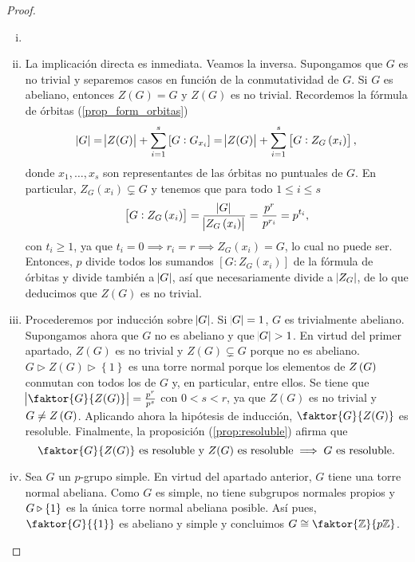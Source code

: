\begin{proof}
    \begin{enumerate}[i)]
        \item[]
        \item La implicación directa es inmediata. Veamos la inversa. Supongamos que $G$ es no trivial y separemos casos en función de la conmutatividad de $G$. Si $G$ es abeliano, entonces $Z(G) = G$ y $Z(G)$ es no trivial.
            Recordemos la fórmula de órbitas (\ref{prop_form_orbitas})
            \[
                \abs{G} =  \abs{Z(G)} + \sum^s_{i=1} \left[ G : G_{x_i} \right] =  \abs{Z(G)} + \sum^s_{i=1} \left[ G : Z_G\left( x_i \right) \right],
            \]
            donde $x_1, \dots, x_s$ son representantes de las órbitas no puntuales de $G$. En
            particular, $Z_G\left( x_i \right) \subsetneq G$ y tenemos que para todo $1\leq i\leq s$
            \[
                \left[ G : Z_G\left( x_i \right) \right] = \frac{\abs{G}}{\abs{Z_G\left( x_i \right)}} =
                \frac{p^r}{p^{r_i}} = p^{t_i},
            \]
            con $t_i \geq 1$, ya que $t_i = 0 \implies r_i = r \implies Z_G\left( x_i \right) = G$, lo cual no
            puede ser. Entonces, $p$ divide todos los sumandos $\left[ G : Z_G\left( x_i \right) \right]$ de la fórmula de órbitas y divide también a $\abs{G}$, así que necesariamente divide a $\abs{Z_G}$, de lo que deducimos que $Z(G)$ es no trivial.
            
        \item Procederemos por inducción sobre $\abs{G}$. Si $\abs{G} = 1$, $G$ es trivialmente abeliano.
            Supongamos ahora que $G$ no es abeliano y que $\abs{G} > 1$. En virtud del primer apartado,
            $Z(G)$ es no trivial y $Z(G) \subsetneq G$ porque no es abeliano.
            $G \triangleright Z(G) \triangleright \left\{ 1 \right\}$ es una torre normal
            porque los elementos de $Z\left( G\right)$ conmutan con todos los de $G$ y, en particular,
            entre ellos. Se tiene que 
            $\abs{\faktor{G}{Z(G)}} = \frac{p^r}{p^{s}}$ con $0 < s < r$, ya que $Z(G)$ es no trivial y
            $G\neq Z\left( G\right)$. Aplicando ahora la hipótesis de inducción, $\faktor{G}{Z(G)}$ es resoluble.
            Finalmente, la proposición (\ref{prop:resoluble}) afirma que             
            \[
                \faktor{G}{Z(G)} \text{ es resoluble y } Z(G) \text{ es resoluble} \implies G
                \text{ es resoluble}.
            \]
        \item Sea $G$ un $p$-grupo simple. En virtud del apartado anterior, $G$ tiene una torre normal abeliana.
            Como $G$ es simple, no tiene subgrupos normales propios y
            $G \triangleright \left\{ 1 \right\}$ es la única torre normal abeliana posible.
            Así pues, $\faktor{G}{\lc 1\rc}$ es abeliano y simple y concluimos $G \cong \faktor{\z}{p\z}$.
    \end{enumerate}
\end{proof}



